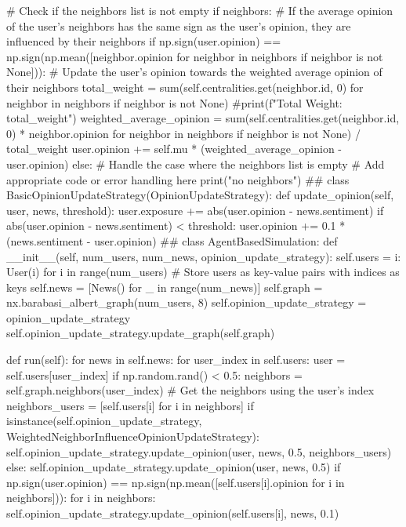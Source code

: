 \begin{codigo}[caption={Simulando redes sociais segundo a modelagem baseada em agentes}, label={codigo:mba}, language=Python, breaklines=true]
    # Check if the neighbors list is not empty
    if neighbors:
        # If the average opinion of the user's neighbors has the same sign as the user's opinion, they are influenced by their neighbors
        if np.sign(user.opinion) == np.sign(np.mean([neighbor.opinion for neighbor in neighbors if neighbor is not None])):
            # Update the user's opinion towards the weighted average opinion of their neighbors
            total_weight = sum(self.centralities.get(neighbor.id, 0) for neighbor in neighbors if neighbor is not None)
            #print(f"Total Weight: {total_weight}")
            weighted_average_opinion = sum(self.centralities.get(neighbor.id, 0) * neighbor.opinion for neighbor in neighbors if neighbor is not None) / total_weight
            user.opinion += self.mu * (weighted_average_opinion - user.opinion)
    else:
        # Handle the case where the neighbors list is empty
        # Add appropriate code or error handling here
        print("no neighbors")
##
class BasicOpinionUpdateStrategy(OpinionUpdateStrategy):
  def update_opinion(self, user, news, threshold):
      user.exposure += abs(user.opinion - news.sentiment)
      if abs(user.opinion - news.sentiment) < threshold:
          user.opinion += 0.1 * (news.sentiment - user.opinion)
##
class AgentBasedSimulation:
  def __init__(self, num_users, num_news, opinion_update_strategy):
      self.users = {i: User(i) for i in range(num_users)}  # Store users as key-value pairs with indices as keys
      self.news = [News() for _ in range(num_news)]
      self.graph = nx.barabasi_albert_graph(num_users, 8)
      self.opinion_update_strategy = opinion_update_strategy
      self.opinion_update_strategy.update_graph(self.graph)

  def run(self):
      for news in self.news:
          for user_index in self.users:
              user = self.users[user_index]
              if np.random.rand() < 0.5:
                  neighbors = self.graph.neighbors(user_index)  # Get the neighbors using the user's index
                  neighbors_users = [self.users[i] for i in neighbors]
                  if isinstance(self.opinion_update_strategy, WeightedNeighborInfluenceOpinionUpdateStrategy):
                      self.opinion_update_strategy.update_opinion(user, news, 0.5, neighbors_users)
                  else:
                      self.opinion_update_strategy.update_opinion(user, news, 0.5)
                  if np.sign(user.opinion) == np.sign(np.mean([self.users[i].opinion for i in neighbors])):
                      for i in neighbors:
                          self.opinion_update_strategy.update_opinion(self.users[i], news, 0.1)


\end{codigo}
